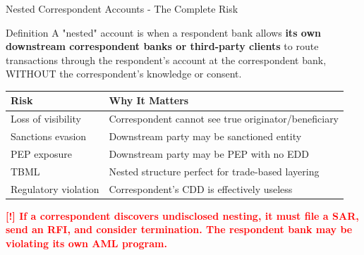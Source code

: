 \documentclass[11pt,a4paper]{beamer}
\newcommand{\redflag}[1]{\textcolor{red}{\textbf{[!] #1}}}
\begin{document}

\begin{frame}{Nested Correspondent Accounts - The Complete Risk}
\begin{block}{Definition}
A "nested" account is when a respondent bank allows \textbf{its own downstream correspondent banks or third-party clients} to route transactions through the respondent's account at the correspondent bank, WITHOUT the correspondent's knowledge or consent.
\end{block}
\begin{tabular}{p{}|p{}}
\hline
\rowcolor{lightgray}
\textbf{Risk} & \textbf{Why It Matters} \\
\hline
Loss of visibility & Correspondent cannot see true originator/beneficiary \\
\hline
Sanctions evasion & Downstream party may be sanctioned entity \\
\hline
PEP exposure & Downstream party may be PEP with no EDD \\
\hline
TBML & Nested structure perfect for trade-based layering \\
\hline
Regulatory violation & Correspondent's CDD is effectively useless \\
\hline
\end{tabular}
\vspace{0.2cm}
\redflag{If a correspondent discovers undisclosed nesting, it must file a SAR, send an RFI, and consider termination. The respondent bank may be violating its own AML program.}
\end{frame}

\end{document}
